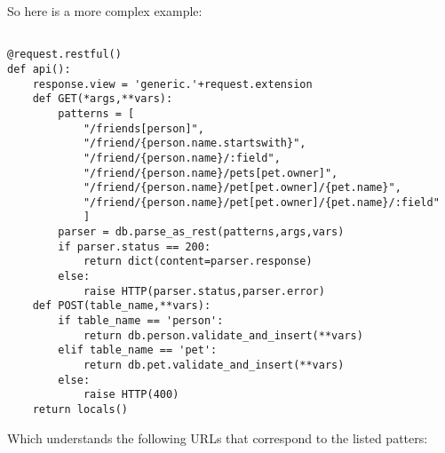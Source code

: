 \documentclass[justified,sixbynine,notoc]{tufte-book}
\begin{document}
\begin{fullwidth}
So here is a more complex example:

\begin{lstlisting}

@request.restful()
def api():
    response.view = 'generic.'+request.extension
    def GET(*args,**vars):
        patterns = [
            "/friends[person]",
            "/friend/{person.name.startswith}",
            "/friend/{person.name}/:field",
            "/friend/{person.name}/pets[pet.owner]",
            "/friend/{person.name}/pet[pet.owner]/{pet.name}",
            "/friend/{person.name}/pet[pet.owner]/{pet.name}/:field"
            ]
        parser = db.parse_as_rest(patterns,args,vars)
        if parser.status == 200:
            return dict(content=parser.response)
        else:
            raise HTTP(parser.status,parser.error)
    def POST(table_name,**vars):
        if table_name == 'person':
            return db.person.validate_and_insert(**vars)
        elif table_name == 'pet':
            return db.pet.validate_and_insert(**vars)
        else:
            raise HTTP(400)
    return locals()
\end{lstlisting}

Which understands the following URLs that correspond to the listed patters:


\end{fullwidth}
\end{document}
